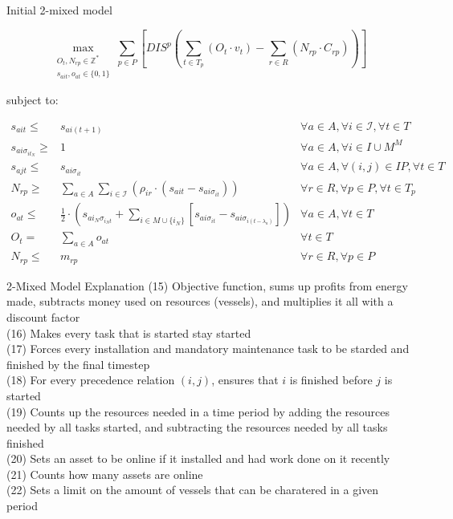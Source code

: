 \documentclass{beamer}
\begin{document}

\begin{frame}{Initial 2-mixed model}
\scriptsize

\begin{equation}
	\max_{\substack{O_t, N_{rp} \in \mathbb{Z}^* \\ 
	s_{ait}, o_{at} \in \{0, 1\}}} 
	\sum_{p \in P} [ DIS^p (\sum_{t\in T_p} (O_t \cdot v_t)  - \sum_{r\in R} (N_{rp} \cdot C_{rp})) ]
\end{equation}

\bigskip

subject to:

\begin{align}
s_{ait} \leq& s_{ai(t+1)}																	& \forall a \in A, \forall i \in \mathcal{I}, \forall t \in T	\\
s_{ai\sigma_{it_N}} \geq& 1																& \forall a \in A, \forall i \in I\cup M^M			\\
s_{ajt} \leq& s_{ai\sigma_{it}}																& \forall a \in A, \forall (i, j) \in IP, \forall t \in T 	\\
N_{rp} \geq& \sum_{a\in A} \sum_{i\in \mathcal{I}} (\rho_{ir} \cdot (s_{ait} - s_{ai\sigma_{it}})) 						& \forall r \in R, \forall p \in P, \forall t \in T_p 		\\
o_{at} \leq& \frac{1}{2} \cdot (s_{ai_N\sigma_{i_Nt}} + \sum_{i \in M \cup \{i_N\}} [s_{ai\sigma_{it}} - s_{ai\sigma_{i(t-\lambda_a)}}])	& \forall a \in A, \forall t \in T			\\
O_t =& \sum_{a \in A} o_{at}																& \forall t \in T 						\\
N_{rp} \leq& m_{rp}																	& \forall r \in R, \forall p \in P
\end{align}

\end{frame}

\begin{frame}{2-Mixed Model Explanation}
(15) Objective function, sums up profits from energy made, subtracts money used on resources (vessels), and multiplies it all with a discount factor	\\
(16) Makes every task that is started stay started 	\\
(17) Forces every installation and mandatory maintenance task to be starded and finished by the final timestep	\\
(18) For every precedence relation $(i, j)$, ensures that $i$ is finished before $j$ is started 	\\
(19) Counts up the resources needed in a time period by adding the resources needed by all tasks started, and subtracting the resources needed by all tasks finished	\\
(20) Sets an asset to be online if it installed and had work done on it recently \\
(21) Counts how many assets are online \\
(22) Sets a limit on the amount of vessels that can be charatered in a given period
\end{frame}
\end{document}
